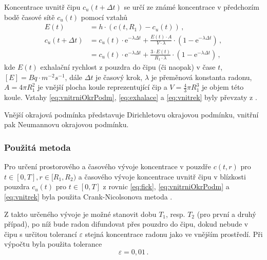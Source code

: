 \documentclass[11pt,a4paper]{article}
\begin{document}
Koncentrace uvnitř čipu $c_u(t+\Delta t)$ se určí ze známé koncentrace v předchozím bodě časové sítě $c_u(t)$ pomocí vztahů
\begin{align}
	E(t)&=h\cdot(c(t,R_1)-c_u(t))\,,\label{eq:exhalace}\\
	c_u(t+\Delta t)&=c_u(t)\cdot \mathrm{e}^{-\lambda\Delta t}+\frac{E(t)\cdot A}{V\cdot \lambda}\cdot \left(1-\mathrm{e}^{-\lambda\Delta t}\right)\,,\nonumber\\
	&=c_u(t)\cdot \mathrm{e}^{-\lambda\Delta t}+\frac{3\cdot E(t)}{R_1\cdot \lambda}\cdot \left(1-\mathrm{e}^{-\lambda\Delta t}\right)\,,\label{eq:vnitrek}
\end{align}
kde $E(t)$ exhalační rychlost z pouzdra do čipu (či naopak) v čase $t$, $[E]=\si{Bq\cdot m^{-2}s^{-1}}$, dále $\Delta t$ je časový krok, $\lambda$ je přeměnová konstanta radonu, $A=4\pi R_1^2$ je vnější plocha koule reprezentující čip a $V=\frac{4}{3}\pi R_1^3$ je objem této koule. Vztahy \eqref{eq:vnitrniOkrPodm}, \eqref{eq:exhalace} a \eqref{eq:vnitrek} byly převzaty z \cite{jiranek1}.

Vnější okrajová podmínka představuje Dirichletovu okrajovou podmínku, vnitřní pak Neumannovu okrajovou podmínku.
\subsubsection{Použitá metoda}
Pro určení prostorového a časového vývoje koncentrace v pouzdře $c(t,r)$ pro $t\in[0, T], r\in[R_1, R_2)$ a časového vývoje koncentrace uvnitř čipu v blízkosti pouzdra $c_u(t)$ pro $t\in[0,T]$ z rovnic \eqref{eq:fick}, \eqref{eq:vnitrniOkrPodm} a \eqref{eq:vnitrek} byla použita Crank-Nicolsonova metoda \cite{numerical_methods, wiki}. 

Z takto určeného vývoje je možné stanovit dobu $T_1$, resp. $T_2$ (pro první a druhý případ), po níž bude radon difundovat přes pouzdro do čipu, dokud nebude v čipu s určitou tolerancí $\varepsilon$ stejná koncentrace radonu jako ve vnějším prostředí. Při výpočtu byla použita tolerance
\begin{equation}
	\varepsilon=0,01\,.
\end{equation}
\end{document}

